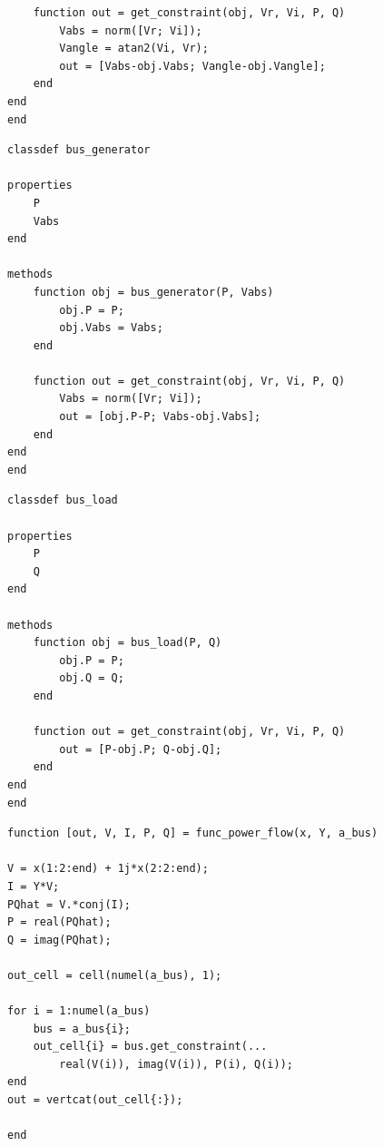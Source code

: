 \documentclass[tombow,dvipdfmx]{corona-a5-1.1}
\begin{document}
{\begin{例}[母線の実装の分離]
\begin{PROGRAMA}[count,title={bus\_slack.m}]
\begin{verbatim}
    function out = get_constraint(obj, Vr, Vi, P, Q)
        Vabs = norm([Vr; Vi]);
        Vangle = atan2(Vi, Vr);
        out = [Vabs-obj.Vabs; Vangle-obj.Vangle];
    end
end
end
\end{verbatim}
\end{PROGRAMA}

\smallskip
\begin{PROGRAMA}[count,title={bus\_genertor.m}]\label{program:bus_PV}
\begin{verbatim}
classdef bus_generator

properties
    P
    Vabs
end

methods
    function obj = bus_generator(P, Vabs)
        obj.P = P;
        obj.Vabs = Vabs;
    end
    
    function out = get_constraint(obj, Vr, Vi, P, Q)
        Vabs = norm([Vr; Vi]);
        out = [obj.P-P; Vabs-obj.Vabs];
    end
end
end
\end{verbatim}
\end{PROGRAMA}

\smallskip
\begin{PROGRAMA}[count,title={bus\_load.m}]\label{program:bus_PQ}
\begin{verbatim}
classdef bus_load

properties
    P
    Q
end

methods
    function obj = bus_load(P, Q)
        obj.P = P;
        obj.Q = Q;
    end
    
    function out = get_constraint(obj, Vr, Vi, P, Q)
        out = [P-obj.P; Q-obj.Q];
    end
end
end
\end{verbatim}
\end{PROGRAMA}

\smallskip


\begin{PROGRAMA}[count, title={func\_ex4.m}]\label{program:ex4}%
\begin{verbatim}
function [out, V, I, P, Q] = func_power_flow(x, Y, a_bus)

V = x(1:2:end) + 1j*x(2:2:end);
I = Y*V;
PQhat = V.*conj(I);
P = real(PQhat);
Q = imag(PQhat);

out_cell = cell(numel(a_bus), 1);

for i = 1:numel(a_bus)
    bus = a_bus{i};
    out_cell{i} = bus.get_constraint(...
        real(V(i)), imag(V(i)), P(i), Q(i));
end
out = vertcat(out_cell{:});

end
\end{verbatim}
\end{PROGRAMA}


\end{例}}
\end{document}
